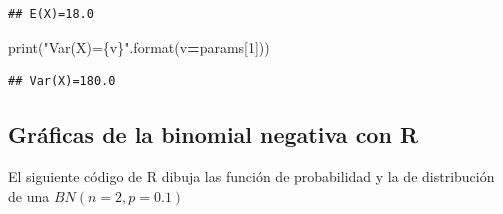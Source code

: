 \documentclass[]{book}
\newenvironment{Shaded}{\begin{snugshade}}{\end{snugshade}}
\newcommand{\BuiltInTok}[1]{#1}
\newcommand{\DecValTok}[1]{\textcolor[rgb]{0.00,0.00,0.81}{#1}}
\newcommand{\NormalTok}[1]{#1}
\newcommand{\OperatorTok}[1]{\textcolor[rgb]{0.81,0.36,0.00}{\textbf{#1}}}
\newcommand{\SpecialCharTok}[1]{\textcolor[rgb]{0.00,0.00,0.00}{#1}}
\newcommand{\StringTok}[1]{\textcolor[rgb]{0.31,0.60,0.02}{#1}}
\begin{document}
\begin{verbatim}
## E(X)=18.0
\end{verbatim}

\begin{Shaded}
\begin{Highlighting}[]
\BuiltInTok{print}\NormalTok{(}\StringTok{"Var(X)=}\SpecialCharTok{\{v\}}\StringTok{"}\NormalTok{.}\BuiltInTok{format}\NormalTok{(v}\OperatorTok{=}\NormalTok{params[}\DecValTok{1}\NormalTok{]))}
\end{Highlighting}
\end{Shaded}

\begin{verbatim}
## Var(X)=180.0
\end{verbatim}

\hypertarget{gruxe1ficas-de-la-binomial-negativa-con-r}{%
\subsection{Gráficas de la binomial negativa con R}\label{gruxe1ficas-de-la-binomial-negativa-con-r}}

El siguiente código de R dibuja las función de probabilidad y la de distribución de una \(BN(n=2,p=0.1)\)
\end{document}
